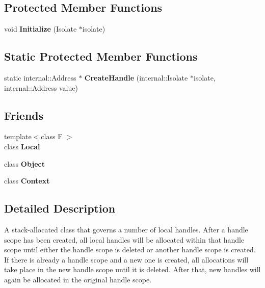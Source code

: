 \subsection*{Protected Member Functions}
\begin{DoxyCompactItemize}
\item 
\mbox{\label{classv8_1_1HandleScope_a7bb8631c1c8756b05e9232b8414dd992}} 
void {\bfseries Initialize} (Isolate $\ast$isolate)
\end{DoxyCompactItemize}
\subsection*{Static Protected Member Functions}
\begin{DoxyCompactItemize}
\item 
\mbox{\label{classv8_1_1HandleScope_a1dfeb02024b2b75746a1aa1f0b2e94fa}} 
static internal\+::\+Address $\ast$ {\bfseries Create\+Handle} (internal\+::\+Isolate $\ast$isolate, internal\+::\+Address value)
\end{DoxyCompactItemize}
\subsection*{Friends}
\begin{DoxyCompactItemize}
\item 
\mbox{\label{classv8_1_1HandleScope_afb872edb4aac7ba55f0da004113aa2b0}} 
{\footnotesize template$<$class F $>$ }\\class {\bfseries Local}
\item 
\mbox{\label{classv8_1_1HandleScope_a0720b5f434e636e22a3ed34f847eec57}} 
class {\bfseries Object}
\item 
\mbox{\label{classv8_1_1HandleScope_ac26c806e60ca4a0547680edb68f6e39b}} 
class {\bfseries Context}
\end{DoxyCompactItemize}


\subsection{Detailed Description}
A stack-\/allocated class that governs a number of local handles. After a handle scope has been created, all local handles will be allocated within that handle scope until either the handle scope is deleted or another handle scope is created. If there is already a handle scope and a new one is created, all allocations will take place in the new handle scope until it is deleted. After that, new handles will again be allocated in the original handle scope.

